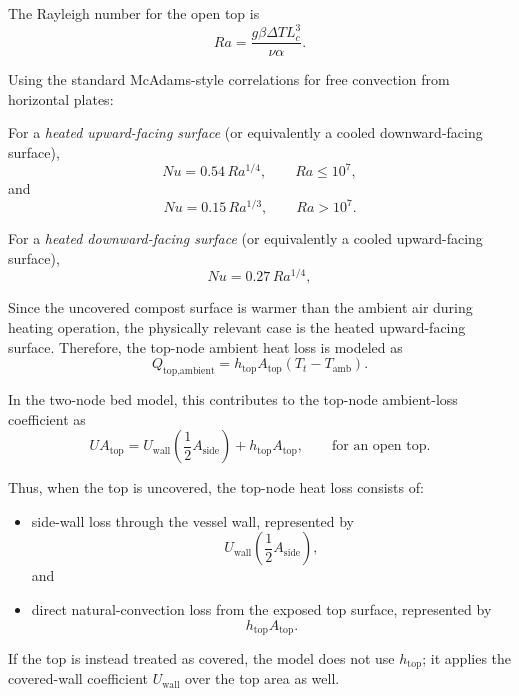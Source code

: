 \documentclass{article}
\begin{document}
The Rayleigh number for the open top is
\begin{equation}
Ra=\frac{g\beta\Delta T L_c^3}{\nu\alpha}.
\end{equation}

Using the standard McAdams-style correlations for free convection from
horizontal plates:

For a \emph{heated upward-facing surface} (or equivalently a cooled
downward-facing surface),
\begin{equation}
Nu = 0.54\,Ra^{1/4},
\qquad
Ra \le 10^{7},
\end{equation}
and
\begin{equation}
Nu = 0.15\,Ra^{1/3},
\qquad
Ra > 10^{7}.
\end{equation}

For a \emph{heated downward-facing surface} (or equivalently a cooled
upward-facing surface),
\begin{equation}
Nu = 0.27\,Ra^{1/4},
\end{equation}

Since the uncovered compost surface is warmer than the ambient air during
heating operation, the physically relevant case is the heated upward-facing
surface. Therefore, the top-node ambient heat loss is modeled as
\begin{equation}
Q_{\text{top,ambient}}
=
h_{\text{top}}A_{\text{top}}(T_t-T_{\text{amb}}).
\end{equation}

In the two-node bed model, this contributes to the top-node ambient-loss
coefficient as
\begin{equation}
UA_{\text{top}}
=
U_{\text{wall}}\left(\frac{1}{2}A_{\text{side}}\right)
+
h_{\text{top}}A_{\text{top}},
\qquad \text{for an open top.}
\end{equation}

Thus, when the top is uncovered, the top-node heat loss consists of:
\begin{itemize}
\item side-wall loss through the vessel wall, represented by
\[
U_{\text{wall}}\left(\frac{1}{2}A_{\text{side}}\right),
\]
and
\item direct natural-convection loss from the exposed top surface,
      represented by
\[
h_{\text{top}}A_{\text{top}}.
\]
\end{itemize}

If the top is instead treated as covered, the model does not use
$h_{\text{top}}$; it applies the covered-wall coefficient $U_{\text{wall}}$
over the top area as well.
\end{document}
